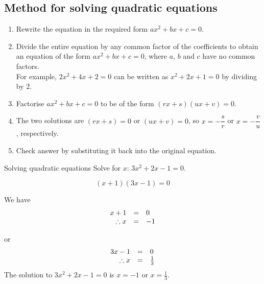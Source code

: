 \subsection*{Method for solving quadratic equations}
\begin{enumerate}[noitemsep, label=\textbf{\arabic*}. ] 
\item Rewrite the equation in the required form $ax^{2} +bx +c =0$.
\item Divide the entire equation by any common factor of the coefficients
to obtain an equation of the form $a{x}^{2}+bx+c=0$, where $a$, $b$ and
$c$ have no common factors.
\\For example, $2{x}^{2}+4x+2=0$ can be written as
${x}^{2}+2x+1=0$ by dividing by $2$.
\item Factorise $a{x}^{2}+bx+c=0$ to be of the form $(rx+s)(ux+v)=0$.

\item The two solutions are $(rx+s)=0$ or $(ux+v)=0$, so $x = -\dfrac{s}{r}$ or $x=-\dfrac{v}{u}$, respectively.
\item Check answer by substituting it back into the original equation.
\end{enumerate}


        
\begin{wex}
{Solving quadratic equations }
{Solve for $x$: $3{x}^{2}+2x-1=0$.}
{

\begin{equation*}
(x+1)(3x-1)=0
\end{equation*}

We have
\begin{equation*}
     \begin{array}{ccc}\hfill x+1&=&0\hfill \\
	\hfill \therefore x&=&-1
    \end{array}
\end{equation*}

or
\begin{equation*}
     \begin{array}{ccc}\hfill 3x-1&=&0\hfill \\
	\hfill \therefore x&=&\frac{1}{3}
    \end{array}
\end{equation*}
The solution to $3{x}^{2}+2x-1=0$ is $x=-1$ or $x=\frac{1}{3}$.
}
\end{wex}


